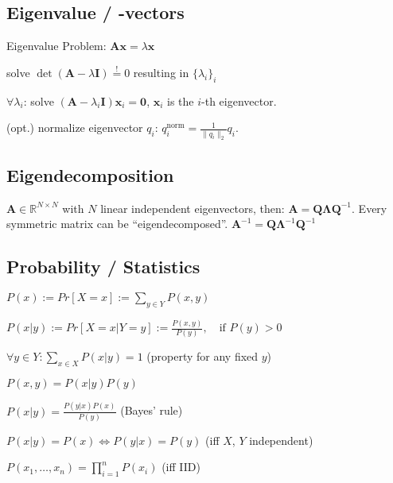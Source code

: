 \documentclass[a4paper, 11pt, landscape]{article}
\begin{document}
\begin{multicols*}{3}
\subsection{Eigenvalue / -vectors}
Eigenvalue Problem: $\mathbf{Ax} = \lambda \mathbf{x}$
\begin{compactenum}
	\item solve $\operatorname{det}(\mathbf{A} - \lambda \mathbf{I}) \overset{!}{=} 0$ resulting in $\{\lambda_i\}_i$
	\item $\forall \lambda_i$:
		solve $(\mathbf{A} - \lambda_i \mathbf{I}) \mathbf{x}_i = \mathbf{0}$, $\mathbf{x}_i$ is the $i$-th eigenvector.
	\item (opt.) normalize eigenvector $q_i$: $q_i^{\text{norm}} = \frac{1}{\|q_i\|_2} q_i$.
\end{compactenum}

\subsection{Eigendecomposition}
$\mathbf{A} \in \mathbb{R}^{N \times N}$ with $N$ linear independent eigenvectors, then: $\mathbf{A} = \mathbf{Q} \boldsymbol{\Lambda} \mathbf{Q}^{-1}$. Every symmetric matrix can be ``eigendecomposed''.
$\mathbf{A}^{-1} = \mathbf{Q} \boldsymbol{\Lambda}^{-1} \mathbf{Q}^{-1}$

\subsection{Probability / Statistics}
\begin{inparaitem}[\color{red}\textbullet]
	\item $P(x) := Pr[X = x] := \sum_{y \in Y} P(x, y)$
	\item $P(x|y) := Pr[X = x | Y = y] := \frac{P(x,y)}{P(y)},\quad \text{if } P(y) > 0$
	\item $\forall y \in Y: \sum_{x \in X} P(x|y) = 1$ (property for any fixed $y$)
	\item $P(x, y) = P(x|y) P(y)$
	\item $P(x|y) = \frac{P(y|x)P(x)}{P(y)}$ (Bayes' rule)
	\item $P(x|y) = P(x) \Leftrightarrow P(y|x) = P(y)$ (iff $X$, $Y$ independent)
	\item $P(x_1, \ldots, x_n) = \prod_{i=1}^n P(x_i)$ (iff IID)
\end{inparaitem}



\end{multicols*}
\end{document}
